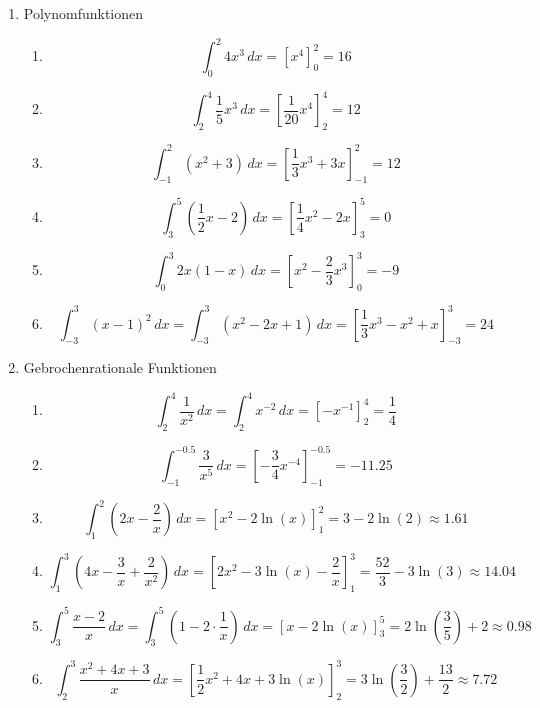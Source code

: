 \begin{enumerate}
	\item Polynomfunktionen
	      \begin{enumerate}
		      \item
		            \[
			            \int_0^2 4x^3\,dx
			            = \left[x^4\right]_0^2
			            = 16
		            \]
		      \item
		            \[
			            \int_2^4 \frac{1}{5}x^3\,dx
			            = \left[\frac{1}{20}x^4\right]_2^4
			            = 12
		            \]
		      \item
		            \[
			            \int_{-1}^2 (x^2+3)\,dx
			            = \left[\frac{1}{3}x^3+3x\right]_{-1}^2
			            = 12
		            \]
		      \item
		            \[
			            \int_3^5 \left(\frac{1}{2}x-2\right)\,dx
			            = \left[\frac{1}{4}x^2-2x\right]_3^5
			            = 0
		            \]
		      \item
		            \[
			            \int_0^3 2x(1-x)\,dx
			            = \left[x^2-\frac{2}{3}x^3\right]_0^3
			            = -9
		            \]
		      \item
		            \[
			            \int_{-3}^3 (x-1)^2\,dx
			            = \int_{-3}^3 (x^2-2x+1) \,dx
			            = \left[\frac{1}{3}x^3-x^2+x\right]_{-3}^3
			            = 24
		            \]
	      \end{enumerate}

	\item Gebrochenrationale Funktionen
	      \begin{enumerate}
		      \item
		            \[
			            \int_2^4 \frac{1}{x^2}\,dx
			            =  \int_2^4 x^{-2}\,dx
			            = \left[-x^{-1}\right]_2^4
			            = \frac{1}{4}
		            \]
		      \item
		            \[
			            \int_{-1}^{-0.5} \frac{3}{x^5}\,dx
			            = \left[-\frac{3}{4}x^{-4}\right]_{-1}^{-0.5}
			            = -11.25
		            \]
		      \item
		            \[
			            \int_1^2 \left(2x-\frac{2}{x}\right)\,dx
			            = \left[x^2-2\ln(x)\right]_1^2
			            = 3-2\ln(2)\approx 1.61
		            \]
		      \item
		            \[
			            \int_1^3 \left(4x-\frac{3}{x}+\frac{2}{x^2}\right)\,dx
			            = \left[2x^2-3\ln(x)-\frac{2}{x}\right]_1^3
			            = \frac{52}{3}-3\ln(3)\approx 14.04
		            \]
		      \item
		            \[
			            \int_3^5 \frac{x-2}{x}\,dx
			            = \int_3^5 \left(1-2\cdot\frac{1}{x}\right)\,dx
			            = \left[x-2\ln(x)\right]_3^5
			            = 2\ln\!\left(\frac{3}{5}\right)+2 \approx 0.98
		            \]
		      \item
		            \[
			            \int_2^3 \frac{x^2+4x+3}{x}\,dx
			            = \left[\frac{1}{2}x^2+4x+3\ln(x)\right]_2^3
			            = 3\ln\!\left(\frac{3}{2}\right)+\frac{13}{2}\approx 7.72
		            \]
	      \end{enumerate}


\end{enumerate}
